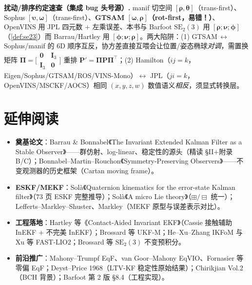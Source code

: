 \begin{note}
\textbf{扰动/排序约定速查（集成 bug 头号源）.}\;
manif 切空间 $[\boldsymbol{\rho},\boldsymbol{\theta}]$（trans-first）、Sophus $[\boldsymbol{\upsilon},\boldsymbol{\omega}]$（trans-first）、\textbf{GTSAM $[\boldsymbol{\omega},\boldsymbol{\rho}]$（rot-first，易错！）}、OpenVINS 用 JPL 四元数 $+$ 左乘误差、本书与 Barfoot $\mathrm{SE}_2(3)$ 用 $[\boldsymbol{\rho};\boldsymbol{\nu};\boldsymbol{\phi}]$（\cref{def:se23}）而 Barrau/Hartley 用 $[\boldsymbol{\phi};\boldsymbol{\nu};\boldsymbol{\rho}]$。两大陷阱：(1) GTSAM\,$\leftrightarrow$\,Sophus/manif 的 $6$D 顺序互反，协方差直接互喂会让位置/姿态椭球\emph{对调}，需置换矩阵 $\boldsymbol{\Pi}=\big[\begin{smallmatrix}\mathbf{0}&\mathbf{I}_3\\\mathbf{I}_3&\mathbf{0}\end{smallmatrix}\big]$ 重排 $\mathbf{P}'=\boldsymbol{\Pi}\mathbf{P}\boldsymbol{\Pi}^\top$；(2) Hamilton（$ij=k$，Eigen/Sophus/GTSAM/ROS/VINS-Mono）$\leftrightarrow$ JPL（$ji=k$，OpenVINS/MSCKF/AOCS）相同 $(x,y,z,w)$ 数值语义\emph{相反}，须显式转换层。
\end{note}

\section*{延伸阅读}

\begin{itemize}
  \item \textbf{奠基论文}：Barrau \& Bonnabel《The Invariant Extended Kalman Filter as a Stable Observer》\cite{barrau2017invariant}——群仿射、log-linear、稳定性的源头（精读 §II$+$附录 B/C）；Bonnabel--Martin--Rouchon《Symmetry-Preserving Observers》\cite{bonnabel2008symmetry}——不变观测器的历史框架（Cartan moving frame）。
  \item \textbf{ESKF/MEKF}：Solà《Quaternion kinematics for the error-state Kalman filter》\cite{sola2017quaternion}（$73$ 页 ESKF 完整推导）；Solà《A micro Lie theory》\cite{sola2018micro}（$\boxplus/\boxminus$ 统一）；Lefferts--Markley--Shuster\cite{lefferts1982kalman}、Markley\cite{markley2003attitude}（MEKF 原型与误差表示对比）。
  \item \textbf{工程落地}：Hartley 等《Contact-Aided Invariant EKF》\cite{hartley2020contact}（Cassie 接触辅助 InEKF $+$ 不完美 InEKF）；Brossard 等 UKF-M\cite{brossard2020ukfm}；He--Xu--Zhang IKFoM\cite{he2021ikfom} 与 Xu 等 FAST-LIO2\cite{xu2022fastlio2}；Brossard 等 $\mathrm{SE}_2(3)$ 不变预积分\cite{brossard2021associating}。
  \item \textbf{前沿推广}：Mahony--Trumpf EqF\cite{mahony2021equivariant}、van Goor--Mahony EqVIO\cite{vangoor2023eqvio}、Fornasier 等零偏 EqF\cite{fornasier2022overcoming}；Deyst--Price 1968\cite{deyst1968conditions}（LTV-KF 稳定性原始结果）；Chirikjian Vol.2\cite{chirikjian2011stochastic}（BCH 背景）；Barfoot 第 2 版\cite{barfoot2024state} §8.4（工程实现）。
\end{itemize}

